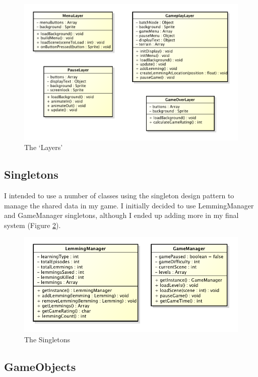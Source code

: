 \documentclass[a4paper,oneside]{report}
\begin{document}
\begin{figure}[h!]
  \centering
    \includegraphics[width=140mm]{sources/images/Layers}
    \caption{The `Layers'}
    \label{fig:Layers}
\end{figure}

\subsection{Singletons}

I intended to use a number of classes using the singleton design pattern to manage the shared data in my game. I initially decided to use LemmingManager and GameManager singletons, although I ended up adding more in my final system (Figure \ref{fig:Singletons}).

\begin{figure}[h!]
  \centering
    \includegraphics[width=120mm]{sources/images/Singletons}
    \caption{The Singletons}
    \label{fig:Singletons}
\end{figure}

\subsection{GameObjects}
\end{document}
